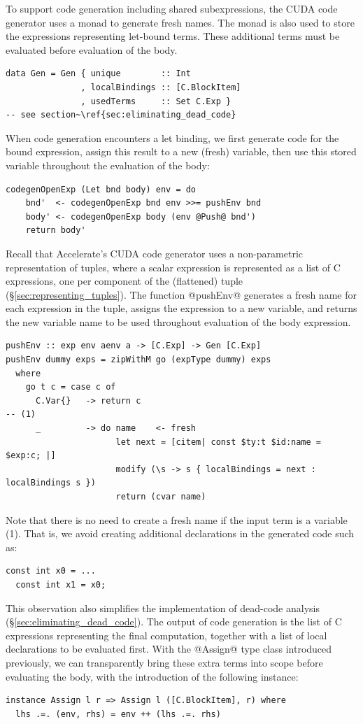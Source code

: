 To support code generation including shared subexpressions, the CUDA code
generator uses a monad to generate fresh names. The monad is also used to store
the expressions representing let-bound terms. These additional terms must be
evaluated before evaluation of the body.
%
\begin{lstlisting}[style=haskell]
data Gen = Gen { unique        :: Int
               , localBindings :: [C.BlockItem]
               , usedTerms     :: Set C.Exp }                            -- see section~\ref{sec:eliminating_dead_code}
\end{lstlisting}

When code generation encounters a let binding, we first generate code for the
bound expression, assign this result to a new (fresh) variable, then use this
stored variable throughout the evaluation of the body:
%
\begin{lstlisting}[style=haskell]
codegenOpenExp (Let bnd body) env = do
    bnd'  <- codegenOpenExp bnd env >>= pushEnv bnd
    body' <- codegenOpenExp body (env @Push@ bnd')
    return body'
\end{lstlisting}

Recall that Accelerate's CUDA code generator uses a non-parametric
representation of tuples, where a scalar expression is represented as a list of
C expressions, one per component of the (flattened) tuple
(\S\ref{sec:representing_tuples}). The function @pushEnv@ generates a fresh
name for each expression in the tuple, assigns the expression to a new variable,
and returns the new variable name to be used throughout evaluation of the body
expression.
%
\begin{lstlisting}[style=haskell]
pushEnv :: exp env aenv a -> [C.Exp] -> Gen [C.Exp]
pushEnv dummy exps = zipWithM go (expType dummy) exps
  where
    go t c = case c of
      C.Var{}   -> return c                                                        -- (1)
      _         -> do name    <- fresh
                      let next = [citem| const $ty:t $id:name = $exp:c; |]
                      modify (\s -> s { localBindings = next : localBindings s })
                      return (cvar name)
\end{lstlisting}
%
Note that there is no need to create a fresh name if the input term is a
variable (1). That is, we avoid creating additional declarations in the
generated code such as:
%
\begin{lstlisting}[language=cuda]
  const int x0 = ...
  const int x1 = x0;
\end{lstlisting}
%
This observation also simplifies the implementation of dead-code analysis
(\S\ref{sec:eliminating_dead_code}). The output of code generation is the list
of C expressions representing the final computation, together with a list of
local declarations to be evaluated first. With the @Assign@ type class
introduced previously, we can transparently bring these extra terms into scope
before evaluating the body, with the introduction of the following instance:
%
\begin{lstlisting}[style=haskell]
instance Assign l r => Assign l ([C.BlockItem], r) where
  lhs .=. (env, rhs) = env ++ (lhs .=. rhs)
\end{lstlisting}


